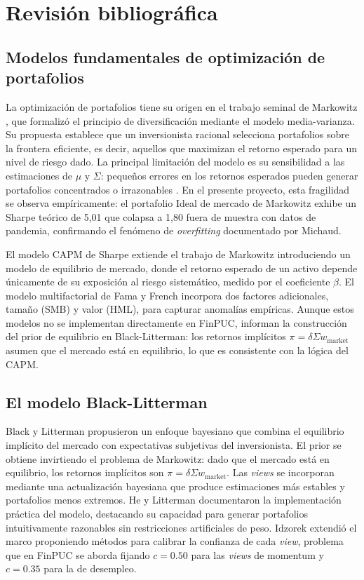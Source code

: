 \section{Revisi\'on bibliogr\'afica}

\subsection{Modelos fundamentales de optimizaci\'on de portafolios}

La optimizaci\'on de portafolios tiene su origen en el trabajo seminal de
Markowitz \cite{markowitz1952}, que formaliz\'o el principio de
diversificaci\'on mediante el modelo media-varianza. Su propuesta establece
que un inversionista racional selecciona portafolios sobre la frontera
eficiente, es decir, aquellos que maximizan el retorno esperado para un nivel
de riesgo dado. La principal limitaci\'on del modelo es su sensibilidad a las
estimaciones de $\mu$ y $\Sigma$: peque\~nos errores en los retornos
esperados pueden generar portafolios concentrados o irrazonables
\cite{michaud1989}. En el presente proyecto, esta fragilidad se observa
emp\'iricamente: el portafolio Ideal de mercado de Markowitz exhibe un Sharpe
te\'orico de 5,01 que colapsa a 1,80 fuera de muestra con datos de pandemia,
confirmando el fen\'omeno de \textit{overfitting} documentado por Michaud.

El modelo CAPM de Sharpe \cite{sharpe1964} extiende el trabajo de Markowitz
introduciendo un modelo de equilibrio de mercado, donde el retorno esperado
de un activo depende \'unicamente de su exposici\'on al riesgo sistem\'atico,
medido por el coeficiente $\beta$. El modelo multifactorial de Fama y French
\cite{famafrench1993} incorpora dos factores adicionales, tama\~no (SMB) y
valor (HML), para capturar anomal\'ias emp\'iricas. Aunque estos modelos no
se implementan directamente en FinPUC, informan la construcci\'on del prior
de equilibrio en Black-Litterman: los retornos impl\'icitos $\pi = \delta
\Sigma w_{\text{market}}$ asumen que el mercado est\'a en equilibrio, lo que
es consistente con la l\'ogica del CAPM.

\subsection{El modelo Black-Litterman}

Black y Litterman \cite{black1992} propusieron un enfoque bayesiano que
combina el equilibrio impl\'icito del mercado con expectativas subjetivas del
inversionista. El prior se obtiene invirtiendo el problema de Markowitz: dado
que el mercado est\'a en equilibrio, los retornos impl\'icitos son
$\pi = \delta \Sigma w_{\text{market}}$. Las \textit{views} se incorporan
mediante una actualizaci\'on bayesiana que produce estimaciones m\'as estables
y portafolios menos extremos. He y Litterman \cite{he1999} documentaron la
implementaci\'on pr\'actica del modelo, destacando su capacidad para generar
portafolios intuitivamente razonables sin restricciones artificiales de peso.
Idzorek \cite{idzorek2005} extendi\'o el marco proponiendo m\'etodos para
calibrar la confianza de cada \textit{view}, problema que en FinPUC se aborda
fijando $c = 0.50$ para las \textit{views} de momentum y $c = 0.35$ para la
de desempleo.

